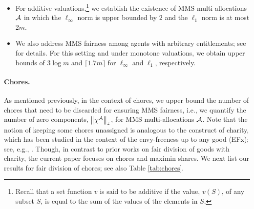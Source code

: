 \begin{itemize}
\item For additive valuations,\footnote{Recall that a set function $v$ is said to be additive if the value, $v(S)$, of any subset $S$, is equal to the sum of the values of the elements in $S$.} we establish the existence of MMS multi-allocations $\mathcal{A}$ in which the $\ell_{\infty}$ norm is upper bounded by $2$ and the $\ell_1$ norm is at most $2m$. 

\item We also address MMS fairness among agents with arbitrary entitlements; see  for details. For this setting and under monotone valuations, we obtain upper bounds of $3 \log m$ and $\lceil 1.7 m \rceil$ for $\ell_\infty$ and $\ell_1$, respectively. 
 \end{itemize}

\paragraph{Chores.} As mentioned previously, in the context of chores, we upper bound the number of chores that need to be discarded for ensuring MMS fairness, i.e., we quantify the number of zero components, $\left\|\chi^{\mathcal{A}}\right\|_z$, for MMS multi-allocations $\mathcal{A}$. Note that the notion of keeping some chores unassigned is analogous to the construct of charity, which has been studied in the context of the envy-freeness up to any good (EFx); see, e.g., \cite{chaudhury2021little}. Though, in contrast to prior works on fair division of goods with charity, the current paper focuses on chores and maximin shares.  We next list our results for fair division of chores; see also Table \ref{tab:chores}.
